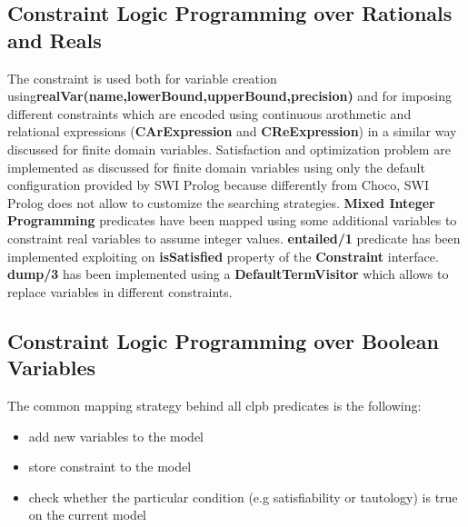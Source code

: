 \subsection{Constraint Logic Programming over Rationals and Reals}\label{subsec:map_clpqr}
The constraint \textbf{{}} is used both for variable creation using\newline\textbf{realVar(name,lowerBound,upperBound,precision)}
and for imposing different constraints which are encoded using continuous arothmetic and relational expressions
(\textbf{CArExpression} and \textbf{CReExpression}) in a similar way discussed for finite domain variables.\newline
Satisfaction and optimization problem are implemented as discussed for finite domain variables using only the default configuration
provided by SWI Prolog because differently from Choco, SWI Prolog does not allow to customize the searching strategies.\newline
\textbf{Mixed Integer Programming} predicates have been mapped using  some additional variables to constraint real variables to
assume integer values.\newline
\textbf{entailed/1} predicate has been implemented exploiting on \textbf{isSatisfied} property of the \textbf{Constraint} interface.\newline
\textbf{dump/3} has been implemented using a \textbf{DefaultTermVisitor} which allows to replace variables in different constraints.

\subsection{Constraint Logic Programming over Boolean Variables}\label{subsec:map_clpb}
The common mapping strategy behind all clpb predicates is the following:
\begin{itemize}
    \item add new variables to the model
    \item store constraint to the model
    \item check whether the particular condition (e.g satisfiability or tautology) is true on the current model
\end{itemize}






